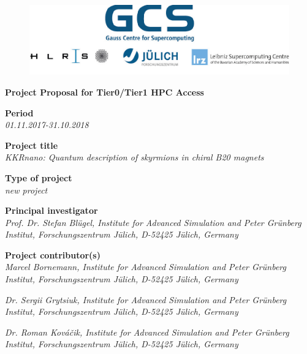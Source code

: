 \documentclass [a4paper, 12pt]{article}
\begin{document}
 
\begin{figure}[H]
\begin{center}
  \includegraphics[scale=0.45]{Figures/GCS-hlrs-fzj-lrz.jpg}\\
\end{center}
\end{figure}

\begin{center}
{\LARGE \bf Project Proposal for Tier0/Tier1 HPC Access} \\

\bigskip
\bigskip
\bigskip
\end{center}
\textbf{Period}\\
\phantom{MM}\textit{01.11.2017-31.10.2018}

\bigskip
\textbf{Project title}\\
\phantom{MM}\textit{KKRnano: Quantum description of skyrmions in chiral B20 magnets}

\bigskip
\textbf{Type of project}\\
\phantom{MM} \textit{new project}


\bigskip
\textbf{Principal investigator}\\
\phantom{MM} \textit{ Prof. Dr. Stefan Bl{\"u}gel,
Institute for Advanced Simulation and Peter Gr\"unberg Institut, Forschungszentrum J\"ulich, D-52425 J\"ulich, Germany
}

\bigskip
\textbf{Project contributor(s)}\\

\phantom{MM} \textit{Marcel Bornemann,
Institute for Advanced Simulation and Peter Gr\"unberg Institut, Forschungszentrum J\"ulich, D-52425 J\"ulich, Germany
}

\phantom{MM} \textit{Dr. Sergii Grytsiuk,
Institute for Advanced Simulation and Peter Gr\"unberg Institut, Forschungszentrum J\"ulich, D-52425 J\"ulich, Germany
}

\phantom{MM} \textit{Dr. Roman Kováčik,
Institute for Advanced Simulation and Peter Gr\"unberg Institut, Forschungszentrum J\"ulich, D-52425 J\"ulich, Germany
}
\end{document}
